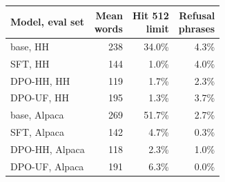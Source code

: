 \scriptsize
\begin{tabularx}{\linewidth}{@{}Xrrr@{}}
\toprule
Model, eval set & \shortstack{Mean\\words} & \shortstack{Hit 512\\limit} & \shortstack{Refusal\\phrases} \\
\midrule
base, HH & 238 & 34.0\% & 4.3\% \\
SFT, HH & 144 & 1.0\% & 4.0\% \\
DPO-HH, HH & 119 & 1.7\% & 2.3\% \\
DPO-UF, HH & 195 & 1.3\% & 3.7\% \\
base, Alpaca & 269 & 51.7\% & 2.7\% \\
SFT, Alpaca & 142 & 4.7\% & 0.3\% \\
DPO-HH, Alpaca & 118 & 2.3\% & 1.0\% \\
DPO-UF, Alpaca & 191 & 6.3\% & 0.0\% \\
\bottomrule
\end{tabularx}
